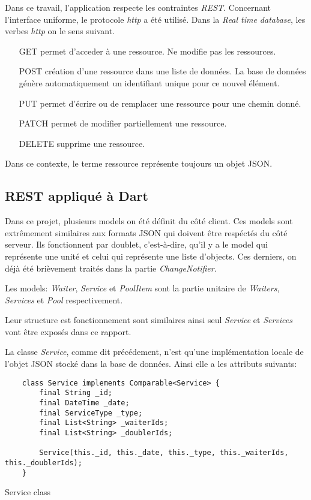 Dans ce travail, l'application respecte les contraintes \textit{REST}. Concernant l'interface uniforme, le protocole \textit{http} a été utilisé. Dans la \textit{Real time database}, les verbes \textit{http} on le sens suivant.
\smallskip
\begin{itemize}
    \item [GET] permet d'acceder à une ressource. Ne modifie pas les ressources.
    \item [POST] création d'une ressource dans une liste de données. La base de données génère automatiquement un identifiant unique pour ce nouvel élément.
    \item [PUT] permet d'écrire ou de remplacer une ressource pour une chemin donné.
    \item [PATCH] permet de modifier partiellement une ressource.
    \item [DELETE] supprime une ressource.
\end{itemize}
\smallskip 
Dans ce contexte, le terme ressource représente toujours un objet JSON.


\subsection{REST appliqué à Dart}
Dans ce projet, plusieurs models on été définit du côté client. Ces models sont extrêmement similaires aux formats JSON qui doivent être respéctés du côté serveur. Ils fonctionnent par doublet, c'est-à-dire, qu'il y a le model qui représente une unité et celui qui représente une liste d'objects. Ces derniers, on déjà été brièvement traités dans la partie \textit{ChangeNotifier}. 

Les models: \textit{Waiter}, \textit{Service} et \textit{PoolItem} sont la partie unitaire de \textit{Waiters}, \textit{Services} et \textit{Pool} respectivement.

Leur structure est fonctionnement sont similaires ainsi seul \textit{Service} et \textit{Services} vont être exposés dans ce rapport.

La classe \textit{Service}, comme dit précédement, n'est qu'une implémentation locale de l'objet JSON stocké dans la base de données. Ainsi elle a les attributs suivants:
\begin{listing}[!h]
\begin{verbatim}
    class Service implements Comparable<Service> {
        final String _id;
        final DateTime _date;
        final ServiceType _type;
        final List<String> _waiterIds;
        final List<String> _doublerIds;
      
        Service(this._id, this._date, this._type, this._waiterIds, this._doublerIds);
    }
\end{verbatim}
\caption{Service class}
\label{code:servicesClass}
\end{listing}


